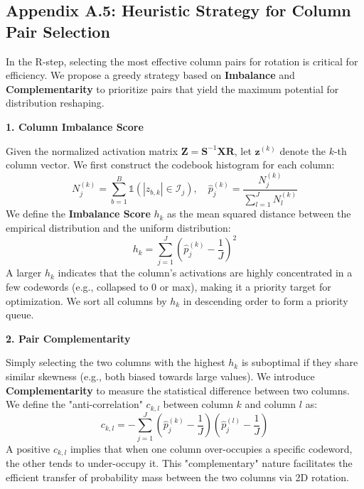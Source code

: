 \subsection*{Appendix A.5: Heuristic Strategy for Column Pair Selection}
\label{app:column_selection}

In the R-step, selecting the most effective column pairs for rotation is critical for efficiency. We propose a greedy strategy based on \textbf{Imbalance} and \textbf{Complementarity} to prioritize pairs that yield the maximum potential for distribution reshaping.

\textbf{1. Column Imbalance Score}

Given the normalized activation matrix $\mathbf{Z} = \mathbf{S}^{-1}\mathbf{X}\mathbf{R}$, let $\mathbf{z}^{(k)}$ denote the $k$-th column vector. We first construct the codebook histogram for each column:
\begin{equation}
N_j^{(k)} = \sum_{b=1}^{B} \mathbb{1}\left( |z_{b,k}| \in \mathcal{I}_j \right), \quad \hat{p}_j^{(k)} = \frac{N_j^{(k)}}{\sum_{l=1}^J N_l^{(k)}}
\end{equation}
We define the \textbf{Imbalance Score} $h_k$ as the mean squared distance between the empirical distribution and the uniform distribution:
\begin{equation}
h_k = \sum_{j=1}^{J} \left( \hat{p}_j^{(k)} - \frac{1}{J} \right)^2
\end{equation}
A larger $h_k$ indicates that the column's activations are highly concentrated in a few codewords (e.g., collapsed to 0 or max), making it a priority target for optimization. We sort all columns by $h_k$ in descending order to form a priority queue.

\textbf{2. Pair Complementarity}

Simply selecting the two columns with the highest $h_k$ is suboptimal if they share similar skewness (e.g., both biased towards large values). We introduce \textbf{Complementarity} to measure the statistical difference between two columns.
We define the "anti-correlation" $c_{k,l}$ between column $k$ and column $l$ as:
\begin{equation}
c_{k,l} = - \sum_{j=1}^{J} \left( \hat{p}_j^{(k)} - \frac{1}{J} \right) \left( \hat{p}_j^{(l)} - \frac{1}{J} \right)
\end{equation}
A positive $c_{k,l}$ implies that when one column over-occupies a specific codeword, the other tends to under-occupy it. This "complementary" nature facilitates the efficient transfer of probability mass between the two columns via 2D rotation.

